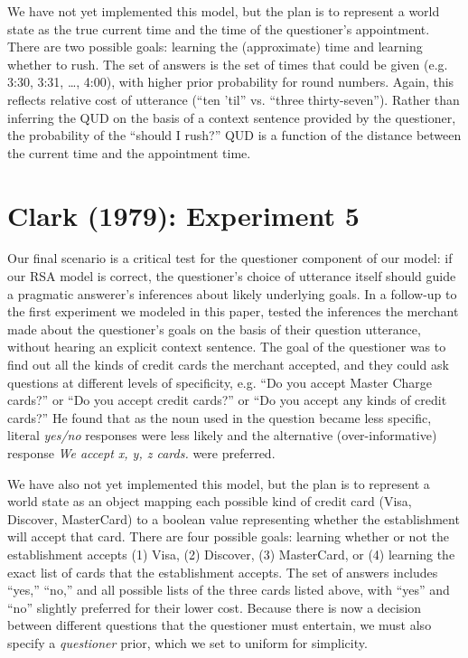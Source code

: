\documentclass[10pt,letterpaper]{article}
\begin{document}
We have not yet implemented this model, but the plan is to represent a world state as the true current time and the time of the questioner's appointment. There are two possible goals: learning the (approximate) time and learning whether to rush. The set of answers is the set of times that could be given (e.g. 3:30, 3:31, \dots, 4:00), with higher prior probability for round numbers. Again, this reflects relative cost of utterance (``ten 'til'' vs. ``three thirty-seven''). Rather than inferring the QUD on the basis of a context sentence provided by the questioner, the probability of the ``should I rush?'' QUD is a function of the distance between the current time and the appointment time. 

\section{Clark (1979): Experiment 5}

Our final scenario is a critical test for the questioner component of our model: if our RSA model is correct, the questioner's choice of utterance itself should guide a pragmatic answerer's inferences about likely underlying goals. In a follow-up to the first experiment we modeled in this paper,  tested the inferences the merchant made about the questioner's goals on the basis of their question utterance, without hearing an explicit context sentence. The goal of the questioner was to find out all the kinds of credit cards the merchant accepted, and they could ask questions at different levels of specificity, e.g. ``Do you accept Master Charge cards?'' or ``Do you accept credit cards?'' or ``Do you accept any kinds of credit cards?'' He found that as the noun used in the question became less specific, literal \emph{yes/no} responses were less likely and the alternative (over-informative) response \emph{We accept x, y, z cards.} were preferred.

We have also not yet implemented this model, but the plan is to represent a world state as an object mapping each possible kind of credit card (Visa, Discover, MasterCard) to a boolean value representing whether the establishment will accept that card. There are four possible goals: learning whether or not the establishment accepts (1) Visa, (2) Discover, (3) MasterCard, or (4) learning the exact list of cards that the establishment accepts. The set of answers includes ``yes,'' ``no,'' and all possible lists of the three cards listed above, with ``yes'' and ``no'' slightly preferred for their lower cost. Because there is now a decision between different questions that the questioner must entertain, we must also specify a \emph{questioner} prior, which we set to uniform for simplicity. 
\end{document}
